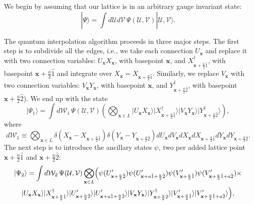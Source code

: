 \documentclass[12pt]{amsart}
\theoremstyle{definition}
\theoremstyle{remark}
\numberwithin{equation}{section}
\begin{document}
We begin by assuming that our lattice is in an arbitrary gauge invariant state:
\begin{equation}	
	|\Psi\rangle = \int d\mathcal{U}d\mathcal{V} \, \Psi(\mathcal{U},\mathcal{V}) |\mathcal{U},\mathcal{V}\rangle.
\end{equation}

The quantum interpolation algorithm proceeds in three major steps. The first step is to subdivide all the edges, i.e., we take each connection $U_\mathbf{x}$ and replace it with two connection variables: $U_\mathbf{x} X_\mathbf{x}$, with basepoint $\mathbf{x}$, and $X^\dag_{\mathbf{x}+\frac{a}{2}\hat{1}}$, with basepoint $\mathbf{x}+\frac{a}{2}\widehat{1}$ and integrate over $X_{\mathbf{x}} = X_{\mathbf{x}+\frac{a}{2}\hat{1}}$. Similarly, we replace $V_{\mathbf{x}}$ with two connection variables: $V_\mathbf{x} Y_\mathbf{x}$, with basepoint $\mathbf{x}$, and $Y^\dag_{\mathbf{x}+\frac{a}{2}\hat{2}}$, with basepoint $\mathbf{x}+\frac{a}{2}\hat{2}$). We end up with the state
\begin{equation}	
	|\Psi_1\rangle = \int d\mathcal{W}_1\, \Psi(\mathcal{U},\mathcal{V}) \left(\bigotimes_{\mathbf{x}\in L} |U_\mathbf{x} X_\mathbf{x}\rangle|X^\dag_{\mathbf{x}+\frac{a}{2}\hat{1}}\rangle|V_\mathbf{x} Y_\mathbf{x}\rangle|Y^\dag_{\mathbf{x}+\frac{a}{2}\hat{2}}\rangle \right),
\end{equation}
where 
\begin{equation}
d\mathcal{W}_1 \equiv  \bigotimes_{\mathbf{x}\in L} \delta(X_\mathbf{x}-X_{\mathbf{x}+\frac{a}{2}\hat{1}})\delta(Y_\mathbf{x} -Y_{\mathbf{x}+\frac{a}{2}\hat{2}}) dU_{\mathbf{x}} dV_{\mathbf{x}} dX_\mathbf{x} dX_{\mathbf{x}+\frac{a}{2}\hat{1}}dY_\mathbf{x} dY_{\mathbf{x}+\frac{a}{2}\hat{2}}.
\end{equation}
The next step is to introduce the ancillary states $\psi$, two per added lattice point $\mathbf{x}+\frac{a}{2}\widehat{1}$ and $\mathbf{x}+\frac{a}{2}\widehat{2}$:
\begin{multline}	
	|\Psi_2\rangle = \int  d\mathcal{W}_2 \, \Psi(\mathcal{U},\mathcal{V}) \bigotimes_{\mathbf{x}\in L}\Bigl( \psi(U_{\mathbf{x}+\frac{a}{2}\hat{2}}')\psi(U_{\mathbf{x}+{a}\hat{1}+\frac{a}{2}\hat{2}}')\psi(V_{\mathbf{x}+\frac{a}{2}\hat{1}}')\psi(V_{\mathbf{x}+\frac{a}{2}\hat{1}+{a}\hat{2}}') \times\\ 
	|U_\mathbf{x} X_\mathbf{x}\rangle|X^\dag_{\mathbf{x}+\frac{a}{2}\hat{1}}\rangle |U_{\mathbf{x}+\frac{a}{2}\hat{2}}'\rangle|U_{\mathbf{x}+{a}\hat{1}+\frac{a}{2}\hat{2}}'\rangle|V_\mathbf{x} Y_\mathbf{x}\rangle|Y^\dag_{\mathbf{x}+\frac{a}{2}\hat{2}}\rangle|V_{\mathbf{x}+\frac{a}{2}\hat{1}}'\rangle |V_{\mathbf{x}+\frac{a}{2}\hat{1}+{a}\hat{2}}'\rangle\Bigr),
\end{multline}
\end{document}
